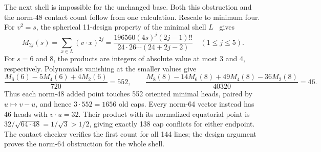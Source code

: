 The next shell is impossible for the unchanged base. Both this
obstruction and the norm-48 contact count follow from one calculation.
Rescale to minimum four. For $v^2=s$, the spherical 11-design property
of the minimal shell $L$~\cite{nebe-designs} gives
\[
M_{2j}(s)=\sum_{x\in L}(v\cdot x)^{2j}
=\frac{196560(4s)^j(2j-1)!!}{24\cdot26\cdots(24+2j-2)}
\quad(1\le j\le5).
\]
For $s=6$ and $8$, the products are integers of absolute value at most
3 and 4, respectively. Polynomials vanishing at the smaller values give
\[
\frac{M_6(6)-5M_4(6)+4M_2(6)}{720}=552,\qquad
\frac{M_8(8)-14M_6(8)+49M_4(8)-36M_2(8)}{40320}=46.
\]
Thus each norm-48 added point touches 552 oriented minimal heads,
paired by $u\mapsto v-u$, and hence $3\cdot552=1656$ old caps.
Every norm-64 vector instead has 46 heads with $v\cdot u=32$.
Their product with its normalized equatorial point is
$32/\sqrt{64\cdot48}=1/\sqrt3>1/2$, giving exactly 138 cap conflicts
for either endpoint. The contact checker verifies the first count for
all 144 lines; the design argument proves the norm-64 obstruction for
the whole shell.
